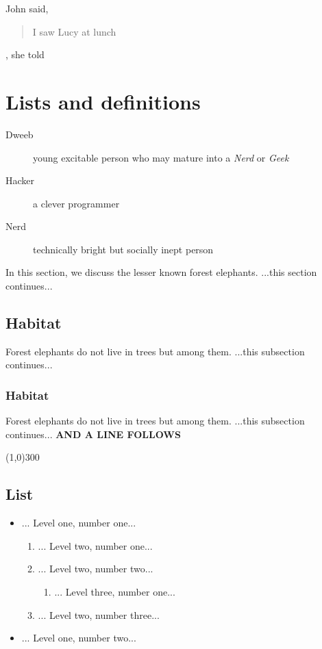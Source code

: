 \documentclass[a4paper,11pt]{article}
\begin{document}
John said, \begin{quote}I saw Lucy at lunch\end{quote}, she told

\section{Lists and definitions}
\begin{description}
	\item[Dweeb] young excitable person who may mature     into a \emph{Nerd} or \emph{Geek}
	\item[Hacker] a clever programmer
	\item[Nerd] technically bright but socially inept person
\end{description}

In this section, we discuss the lesser known forest elephants. ...this section continues...

\subsection{Habitat}

Forest elephants do not live in trees but among them. ...this subsection continues... 

\subsubsection{Habitat}

Forest elephants do not live in trees but among them. ...this subsection continues...  \textbf{AND A LINE FOLLOWS}

\line(1,0){300}


\subsection{List}
\begin{itemize}
	\item  ... Level one, number one...
\begin{enumerate}
	\item  ... Level two, number one...
	\item  ... Level two, number two...
\begin{enumerate}
	\item  ... Level three, number one...
\end{enumerate}
	\item  ... Level two, number three...
\end{enumerate}
	\item  ... Level one, number two...
\end{itemize}
\end{document}
